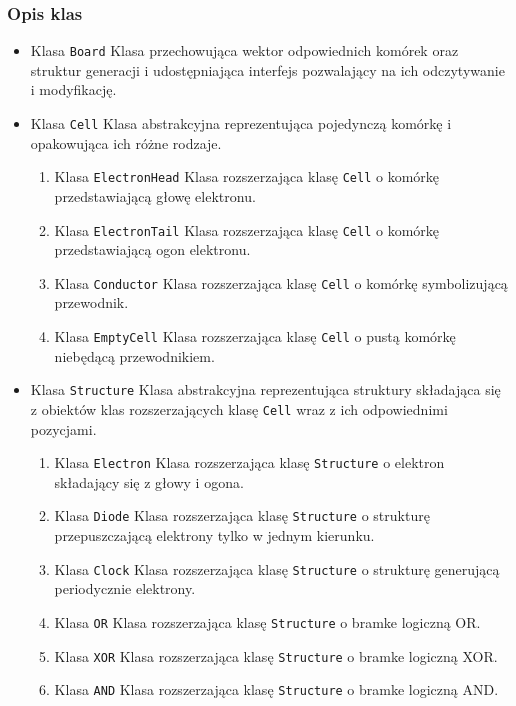 \documentclass[a4paper,11pt]{article}
\begin{document}
\begin{center}
\end{center}

            \subsubsection{Opis klas}
            \begin{itemize}
             \item Klasa \texttt{Board} Klasa przechowująca wektor odpowiednich komórek oraz struktur generacji i udostępniająca interfejs pozwalający na ich odczytywanie i modyfikację.
             \item Klasa \texttt{Cell} Klasa abstrakcyjna reprezentująca pojedynczą komórkę i opakowująca ich różne rodzaje.
             \begin{enumerate}
              \item Klasa \texttt{ElectronHead} Klasa rozszerzająca klasę \texttt{Cell} o komórkę przedstawiającą głowę elektronu.
              \item Klasa \texttt{ElectronTail} Klasa rozszerzająca klasę \texttt{Cell} o komórkę przedstawiającą ogon elektronu.
              \item Klasa \texttt{Conductor}  Klasa rozszerzająca klasę \texttt{Cell} o komórkę symbolizującą przewodnik.
              \item Klasa \texttt{EmptyCell}  Klasa rozszerzająca klasę \texttt{Cell} o pustą komórkę niebędącą przewodnikiem.
             \end{enumerate}
             \item Klasa \texttt{Structure} Klasa abstrakcyjna reprezentująca struktury składająca się z obiektów klas rozszerzających klasę \texttt{Cell} wraz z ich odpowiednimi pozycjami.
             \begin{enumerate}
              \item Klasa \texttt{Electron}  Klasa rozszerzająca klasę \texttt{Structure} o elektron składający się z głowy i ogona.
              \item Klasa \texttt{Diode} Klasa rozszerzająca klasę \texttt{Structure} o strukturę przepuszczającą elektrony tylko w jednym kierunku.
              \item Klasa \texttt{Clock} Klasa rozszerzająca klasę \texttt{Structure} o strukturę generującą periodycznie elektrony.
              \item Klasa \texttt{OR} Klasa rozszerzająca klasę \texttt{Structure} o bramke logiczną OR.
              \item Klasa \texttt{XOR} Klasa rozszerzająca klasę \texttt{Structure} o bramke logiczną XOR.
              \item Klasa \texttt{AND} Klasa rozszerzająca klasę \texttt{Structure} o bramke logiczną AND.
             \end{enumerate}
            \end{itemize}
\end{document}
